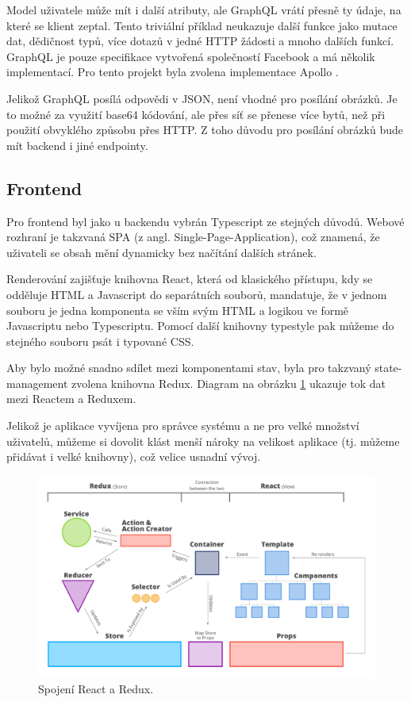 Model uživatele může mít i další atributy, ale GraphQL vrátí přesně ty údaje, na které se klient zeptal.
Tento triviální příklad neukazuje další funkce jako mutace dat, dědičnost typů, více dotazů v jedné HTTP žádosti
a mnoho dalších funkcí.
GraphQL je pouze specifikace vytvořená společností Facebook a má několik
implementací. \citep[][]{GraphQLDoc} Pro tento projekt byla zvolena implementace Apollo \citep[][]{Apollo}.

Jelikož GraphQL posílá odpovědi v JSON, není vhodné pro posílání obrázků. Je to možné za využití base64 kódování,
ale přes síť se přenese více bytů, než při použití obvyklého způsobu přes HTTP. Z toho důvodu pro posílání
obrázků bude mít backend i jiné endpointy.

\subsection{Frontend} \label{frontend}

\noindent
Pro frontend byl jako u backendu vybrán Typescript ze stejných důvodů. Webové rozhraní
je takzvaná SPA (z angl. Single-Page-Application), což znamená, že uživateli se obsah mění dynamicky
bez načítání dalších stránek.

Renderování zajišťuje knihovna React, která od klasického přístupu, kdy se odděluje HTML a Javascript do separátních
souborů, mandatuje, že v jednom souboru je jedna komponenta se vším svým HTML a logikou ve formě Javascriptu nebo
Typescriptu. \citep[][]{Reactjs}
Pomocí další knihovny typestyle pak můžeme do stejného souboru psát i typované CSS.\citep[][]{typestyle}

Aby bylo možné snadno sdílet mezi komponentami stav, byla pro takzvaný state-management zvolena knihovna Redux.
\citep[][]{ReduxCore}
Diagram na obrázku \ref{fig:react_redux_dataflow} ukazuje tok dat mezi Reactem a Reduxem.

Jelikož je aplikace vyvíjena pro správce systému a ne pro velké množství uživatelů, můžeme si dovolit
klást menší nároky na velikost aplikace (tj. můžeme přidávat i velké knihovny), což velice usnadní vývoj.

\begin{figure}[!htb] \centering
\includegraphics[width=145mm]{../img/react-redux-architecture.png}
\caption{Spojení React a Redux. \citep[][]{react_redux_dataflow}}
\label{fig:react_redux_dataflow}
\end{figure}

